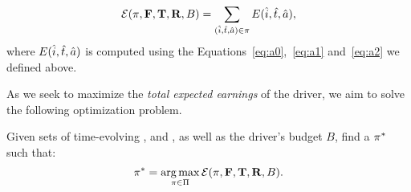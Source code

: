 \begin{equation}\label{eq:totalexpectedearnings}
\mathcal{E} (\pi,{\mathbf{F}},{\mathbf{T}},{\mathbf{R}},B) = \sum_{(\hat{i},\hat{t},\hat{a})\in\pi}E({\hat{i}},{\hat{t}},{\hat{a}}),
\end{equation}
where $E({\hat{i}},{\hat{t}},{\hat{a}})$ is computed
using the Equations~\eqref{eq:a0},~\eqref{eq:a1} and~\eqref{eq:a2} we defined above.

As we seek to maximize the \emph{total expected earnings} of the driver,
we aim to solve the following optimization problem.

\begin{problem}[{\originalproblem}]\label{problem:theproblem}
Given sets of time-evolving {\empiricaltransitionmatrix}, {\traveltimematrix} and {\rewardsmatrix}, as well as the driver's budget $B$,
find a $\pi^\ast$
such that:
\[
\pi^\ast = \operatorname*{arg\,max}_{\pi\in \Pi}\mathcal{E}(\pi,{\mathbf{F}},{\mathbf{T}},{\mathbf{R}},B).
\]
\end{problem}

